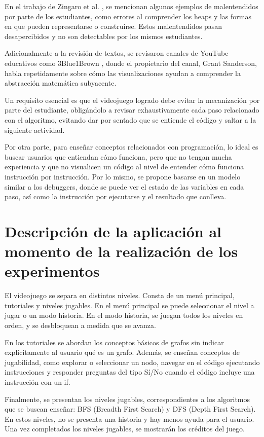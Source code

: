 En el trabajo de Zingaro et al. \cite{IdentifyingStudentDifficultiesDataStructures}, se mencionan algunos ejemplos de malentendidos por parte de los estudiantes, como errores al comprender los heaps y las formas en que pueden representarse o construirse. Estos malentendidos pasan desapercibidos y no son detectables por los mismos estudiantes.

Adicionalmente a la revisión de textos, se revisaron canales de YouTube educativos como 3Blue1Brown \cite{3Blue1BrownYT}, donde el propietario del canal, Grant Sanderson, habla repetidamente sobre cómo las visualizaciones ayudan a comprender la abstracción matemática subyacente.

Un requisito esencial es que el videojuego logrado debe evitar la mecanización por parte del estudiante, obligándolo a revisar exhaustivamente cada paso relacionado con el algoritmo, evitando dar por sentado que se entiende el código y saltar a la siguiente actividad.

Por otra parte, para enseñar conceptos relacionados con programación, lo ideal es buscar usuarios que entiendan cómo funciona, pero que no tengan mucha experiencia y que no visualicen un código al nivel de entender cómo funciona instrucción por instrucción. Por lo mismo, se propone basarse en un modelo similar a los debuggers, donde se puede ver el estado de las variables en cada paso, así como la instrucción por ejecutarse y el resultado que conlleva.

\section{Descripción de la aplicación al momento de la realización de los experimentos}

El videojuego se separa en distintos niveles. Consta de un menú principal, tutoriales y niveles jugables. En el menú principal se puede seleccionar el nivel a jugar o un modo historia. En el modo historia, se juegan todos los niveles en orden, y se desbloquean a medida que se avanza.

En los tutoriales se abordan los conceptos básicos de grafos sin indicar explícitamente al usuario qué es un grafo. Además, se enseñan conceptos de jugabilidad, como explorar o seleccionar un nodo, navegar en el código ejecutando instrucciones y responder preguntas del tipo Sí/No cuando el código incluye una instrucción con un if.

Finalmente, se presentan los niveles jugables, correspondientes a los algoritmos que se buscan enseñar: BFS (Breadth First Search) y DFS (Depth First Search). En estos niveles, no se presenta una historia y hay menos ayuda para el usuario. Una vez completados los niveles jugables, se mostrarán los créditos del juego.

